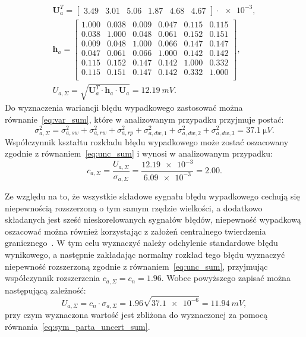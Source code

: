 \begin{gather}
\mathbf{U}_{a}^{T} =
\begin{bmatrix}
3.49 & 3.01 & 5.06 & 1.87 & 4.68 & 4.67
\end{bmatrix} \cdot \num{e-3}
\label{eq:sym_parta_uncert_vector_val}, \\
\mathbf{h}_{a} =
\begin{bmatrix}
1.000 & 0.038 & 0.009 & 0.047 & 0.115 & 0.115 \\
0.038 & 1.000 & 0.048 & 0.061 & 0.152 & 0.151 \\
0.009 & 0.048 & 1.000 & 0.066 & 0.147 & 0.147 \\
0.047 & 0.061 & 0.066 & 1.000 & 0.142 & 0.142 \\
0.115 & 0.152 & 0.147 & 0.142 & 1.000 & 0.332 \\
0.115 & 0.151 & 0.147 & 0.142 & 0.332 & 1.000 \\
\end{bmatrix}
\label{eq:sym_parta_uncert_coher_val}, \\
U_{a,\Sigma} = \sqrt{\mathbf{U}_{a}^{T} \cdot \mathbf{h}_{a} \cdot \mathbf{U}_{a}} = \qty{12.19}{mV} \label{eq:sym_parta_uncert_value_a}.
\end{gather}
Do wyznaczenia wariancji błędu wypadkowego zastosować można równanie~\eqref{eq:var_sum}, które w analizowanym przypadku przyjmuje postać:
\begin{equation}
\sigma_{a,\Sigma}^{2} = \sigma_{a,sw}^{2} + \sigma_{a,rw}^{2} + \sigma_{a,rp}^{2} + \sigma_{a,dw,1}^{2} + \sigma_{a,dw,2}^{2} + \sigma_{a,dw,3}^{2} = \qty{37.1}{\micro V} \label{eq:sym_parta_var_sum}.
\end{equation}
Współczynnik kształtu rozkładu błędu wypadkowego może zostać oszacowany zgodnie z równaniem~\eqref{eq:unc_sum} i wynosi w analizowanym przypadku:
\begin{equation}
c_{a,\Sigma} = \frac{U_{a,\Sigma}}{\sigma_{a,\Sigma}} = \frac{\num{12.19e-3}}{\num{6.09e-3}} = 2.00 \label{eq:sym_parta_uncert_factor}.
\end{equation}

Ze względu na to, że wszystkie składowe sygnału błędu wypadkowego cechują się niepewnością rozszerzoną o tym samym rzędzie wielkości, a dodatkowo składanych jest sześć nieskorelowanych sygnałów błędów, niepewność wypadkową oszacować można również korzystając z założeń centralnego twierdzenia granicznego~\cite{jcgm_guide}. W tym celu wyznaczyć należy odchylenie standardowe błędu wynikowego, a następnie zakładając normalny rozkład tego błędu wyznaczyć niepewność rozszerzoną zgodnie z równaniem~\eqref{eq:unc_sum}, przyjmując współczynnik rozszerzenia $c_{a,\Sigma} = c_{n} = 1.96$. Wobec powyższego zapisać można następującą zależność:
\begin{equation}
U_{a,\Sigma} = c_{n} \cdot \sigma_{a,\Sigma} = 1.96 \sqrt{\num{37.1e-6}} = \qty{11.94}{mV} \label{eq:sym_parta_uncert_value_b},
\end{equation}
przy czym wyznaczona wartość jest zbliżona do wyznaczonej za pomocą równania~\eqref{eq:sym_parta_uncert_sum}.

